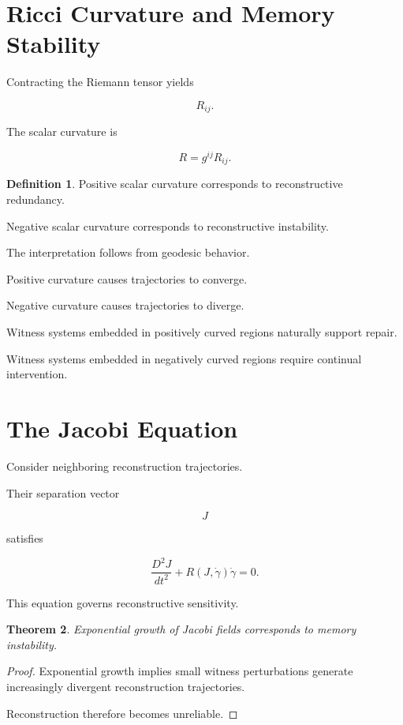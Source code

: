 \documentclass[12pt,oneside]{book}
\theoremstyle{plain} \newtheorem{theorem}{Theorem}[chapter] \newtheorem{lemma}[theorem]{Lemma} \newtheorem{proposition}[theorem]{Proposition} \newtheorem{corollary}[theorem]{Corollary}
\theoremstyle{definition} \newtheorem{definition}[theorem]{Definition} \newtheorem{axiom}[theorem]{Axiom} \newtheorem{construction}[theorem]{Construction}
\theoremstyle{remark} \newtheorem{remark}[theorem]{Remark} \newtheorem{example}[theorem]{Example}
\begin{document}
\section{Ricci Curvature and Memory Stability}

Contracting the Riemann tensor yields

\[
R_{ij}.
\]

The scalar curvature is

\[
R
=
g^{ij}
R_{ij}.
\]

\begin{definition}

Positive scalar curvature corresponds to reconstructive redundancy.

Negative scalar curvature corresponds to reconstructive instability.

\end{definition}

The interpretation follows from geodesic behavior.

Positive curvature causes trajectories to converge.

Negative curvature causes trajectories to diverge.

Witness systems embedded in positively curved regions naturally support repair.

Witness systems embedded in negatively curved regions require continual intervention.

\section{The Jacobi Equation}

Consider neighboring reconstruction trajectories.

Their separation vector

\[
J
\]

satisfies

\[
\frac{D^2J}{dt^2}
+
R(J,\dot\gamma)\dot\gamma
=
0. 

\]

This equation governs reconstructive sensitivity.

\begin{theorem}

Exponential growth of Jacobi fields corresponds to memory instability.

\end{theorem}

\begin{proof}

Exponential growth implies small witness perturbations generate increasingly divergent reconstruction trajectories.

Reconstruction therefore becomes unreliable.

\end{proof}
\end{document}
